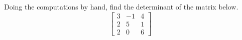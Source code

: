 Doing the computations by hand, find the determinant of the matrix below.
%
\begin{equation*}
\begin{bmatrix}
3 & -1 & 4\\
2 & 5 & 1\\
2 & 0 & 6
\end{bmatrix}
\end{equation*}